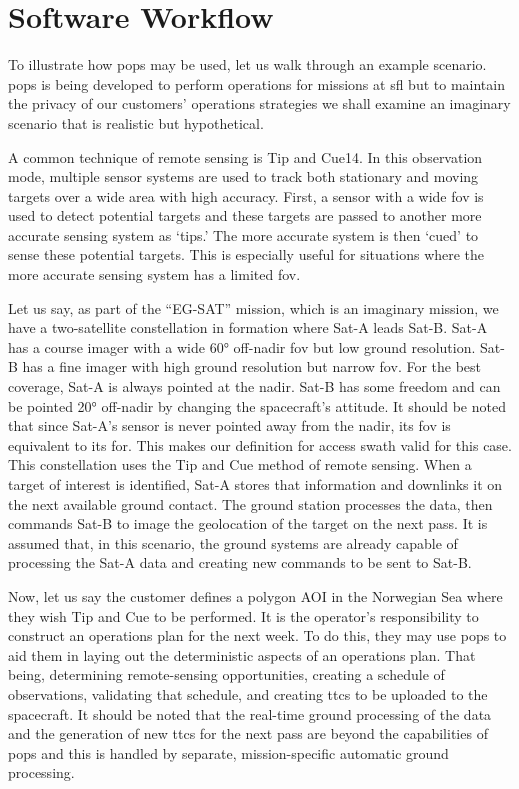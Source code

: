 \glsresetall{} \chapter{Software Workflow}


To illustrate how \gls{pops} may be used, let us walk through an example
scenario.  \gls{pops} is being developed to perform operations for missions at
\gls{sfl} but to maintain the privacy of our customers’ operations strategies we
shall examine an imaginary scenario that is realistic but hypothetical.

A common technique of remote sensing is Tip and Cue14. In this observation
mode, multiple sensor systems are used to track both stationary and moving
targets over a wide area with high accuracy. First, a sensor with a wide
\gls{fov} is used to detect potential targets and these targets are passed to
another more accurate sensing system as ‘tips.’ The more accurate system is
then ‘cued’ to sense these potential targets. This is especially useful for
situations where the more accurate sensing system has a limited \gls{fov}. 

Let us say, as part of the “EG-SAT” mission, which is an imaginary mission, we
have a two-satellite constellation in formation where Sat-A leads Sat-B. Sat-A
has a course imager with a wide 60° off-nadir \gls{fov} but low ground
resolution.  Sat-B has a fine imager with high ground resolution but narrow
\gls{fov}. For the best coverage, Sat-A is always pointed at the nadir. Sat-B has
some freedom and can be pointed 20° off-nadir by changing the spacecraft’s
attitude. It should be noted that since Sat-A’s sensor is never pointed away
from the nadir, its \gls{fov} is equivalent to its \gls{for}. This makes our
definition for access swath valid for this case. This constellation uses the
Tip and Cue method of remote sensing. When a target of interest is identified,
Sat-A stores that information and downlinks it on the next available ground
contact. The ground station processes the data, then commands Sat-B to image
the geolocation of the target on the next pass. It is assumed that, in this
scenario, the ground systems are already capable of processing the Sat-A data
and creating new commands to be sent to Sat-B. 

Now, let us say the customer defines a polygon AOI in the Norwegian Sea where
they wish Tip and Cue to be performed. It is the operator’s responsibility to
construct an operations plan for the next week. To do this, they may use
\gls{pops} to aid them in laying out the deterministic aspects of an operations
plan. That being, determining remote-sensing opportunities, creating a schedule
of observations, validating that schedule, and creating \glspl{ttc} to be
uploaded to the spacecraft. It should be noted that the real-time ground
processing of the data and the generation of new \glspl{ttc} for the next pass
are beyond the capabilities of \gls{pops} and this is handled by separate,
mission-specific automatic ground processing. 


